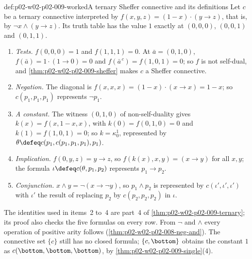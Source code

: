 \begin{hbexample}{def:p02-w02-p02-009-worked}{A ternary Sheffer connective and its definitions}
Let \(c\) be a ternary connective interpreted by
\(f(x,y,z)=(1-x)\cdot(y\to z)\), that is, by \(\neg x\land(y\to z)\).  Its
truth table has the value \(1\) exactly at \((0,0,0)\), \((0,0,1)\) and
\((0,1,1)\).
\begin{enumerate}
\item \emph{Tests.}  \(f(0,0,0)=1\) and \(f(1,1,1)=0\).  At
  \(\bar a=(0,1,0)\), \(f(\bar a)=1\cdot(1\to0)=0\) and
  \(f(\bar a^{\,c})=f(1,0,1)=0\); so \(f\) is not self-dual, and
  \cref{thm:p02-w02-p02-009-sheffer} makes \(c\) a Sheffer connective.
\item \emph{Negation.}  The diagonal is
  \(f(x,x,x)=(1-x)\cdot(x\to x)=1-x\); so \(c(p_1,p_1,p_1)\) represents
  \(\neg p_1\).
\item \emph{A constant.}  The witness \((0,1,0)\) of non-self-duality gives
  \(k(x)=f(x,1-x,x)\), with \(k(0)=f(0,1,0)=0\) and \(k(1)=f(1,0,1)=0\); so
  \(k=\kappa^1_0\), represented by
  \(\theta\defeq c(p_1,c(p_1,p_1,p_1),p_1)\).
\item \emph{Implication.}  \(f(0,y,z)=y\to z\), so
  \(f(k(x),x,y)=(x\to y)\) for all \(x,y\); the formula
  \(\iota\defeq c(\theta,p_1,p_2)\) represents \(p_1\to p_2\).
\item \emph{Conjunction.}  \(x\land y=\neg(x\to\neg y)\), so
  \(p_1\land p_2\) is represented by
  \(c(\iota',\iota',\iota')\) with \(\iota'\) the result of replacing \(p_2\)
  by \(c(p_2,p_2,p_2)\) in \(\iota\).
\end{enumerate}
The identities used in items~2 to~4 are part~4 of
\cref{thm:p02-w02-p02-009-ternary}; its proof also checks the five formulas
on every row.  From
\(\neg\) and \(\land\) every operation of positive arity follows
(\cref{thm:p02-w02-p02-008-neg-and}).  The connective set \(\{c\}\) still
has no closed formula; \(\{c,\bottom\}\) obtains the constant \(1\) as
\(c(\bottom,\bottom,\bottom)\), by \cref{thm:p02-w02-p02-009-single}(4).
\end{hbexample}


